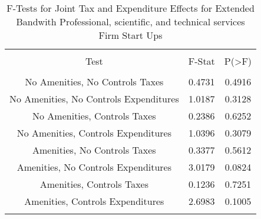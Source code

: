 
\begin{table}[!htbp] \centering 
  \caption{F-Tests for Joint Tax and Expenditure Effects for Extended Bandwith Professional, scientific, and technical services Firm Start Ups} 
  \label{54Ftests} 
\begin{tabular}{@{\extracolsep{5pt}} ccc} 
\\[-1.8ex]\hline 
\hline \\[-1.8ex] 
Test & F-Stat & P(\textgreater F) \\ 
\hline \\[-1.8ex] 
No Amenities, No Controls Taxes & 0.4731 & 0.4916 \\ 
No Amenities, No Controls Expenditures & 1.0187 & 0.3128 \\ 
No Amenities, Controls Taxes & 0.2386 & 0.6252 \\ 
No Amenities, Controls Expenditures & 1.0396 & 0.3079 \\ 
Amenities, No Controls Taxes & 0.3377 & 0.5612 \\ 
Amenities, No Controls Expenditures & 3.0179 & 0.0824 \\ 
Amenities, Controls Taxes & 0.1236 & 0.7251 \\ 
Amenities, Controls Expenditures & 2.6983 & 0.1005 \\ 
\hline \\[-1.8ex] 
\end{tabular} 
\end{table} 
